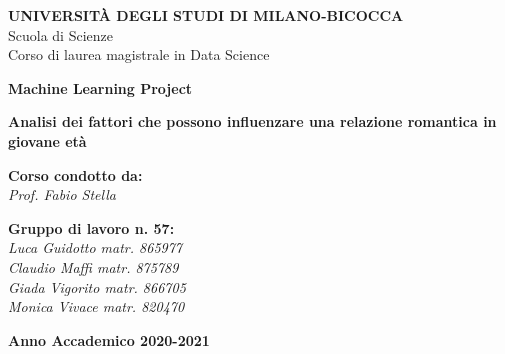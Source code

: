 \documentclass[12pt,a4paper]{report}
\begin{document}
	\begin{center}
		\begin{onehalfspace}
			\par
			\textbf{UNIVERSITÀ DEGLI STUDI DI MILANO-BICOCCA} \\
			Scuola di Scienze \\
			Corso di laurea magistrale in Data Science
		\end{onehalfspace}
	\end{center}
	\smallskip
	
	\begin{doublespace}
		\begin{center}
			{{{\LARGE \textbf{Machine Learning Project}}}}
		\end{center}
	\end{doublespace}

	\smallskip

\begin{doublespace}
	\begin{center}
		{{{\LARGE \textbf{Analisi dei fattori che possono influenzare una relazione romantica in giovane età}}}}
	\end{center}
\end{doublespace}
	\par
	\bigskip
	\bigskip
	\bigskip
	\bigskip
	\bigskip
	\bigskip
	\bigskip
	
	\bigskip
	\bigskip
	\bigskip
	\bigskip
	\bigskip
	\bigskip
	\vspace{8mm}
	\par
	
	\begin{flushleft}
		{\large \textbf{Corso condotto da:}  \\
			\textit{Prof. Fabio Stella}}
	\end{flushleft}
	
	\begin{onehalfspace}
		\begin{flushright}
			{\small \textbf{Gruppo di lavoro n. 57:} \\
				\textit{Luca Guidotto matr. 865977} \\
				\textit{Claudio Maffi matr. 875789}\\
				\textit{Giada Vigorito matr. 866705}\\
				\textit{Monica Vivace matr. 820470}}
		\end{flushright}
	\end{onehalfspace}
	
	
	\vfill
	\par
	\begin{center}
		{\large \textbf{Anno Accademico 2020-2021}}
	\end{center}
	
\end{document}
